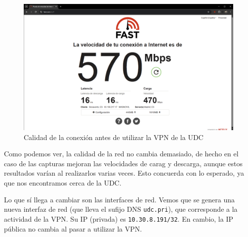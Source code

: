 \begin{figure}[H]
    \centering
    \includegraphics[width=\linewidth]{CalidadConexion-VPN-UDC.png}
    \caption{Calidad de la conexión antes de utilizar la VPN de la UDC}
    \label{fig:Calidad-Conexión-VPN-UDC}
\end{figure}


Como podemos ver, la calidad de la red no cambia demasiado, de hecho en el caso de las capturas mejoran las velocidades de carag y descarga, aunque estos resultados varían al realizarlos varias veces.
Esto concuerda con lo esperado, ya que nos encontramos cerca de la UDC.

Lo que sí llega a cambiar son las interfaces de red. Vemos que se genera una nueva interfaz de red (que lleva el sufijo DNS \texttt{udc.pri}), que corresponde a la actividad de la VPN. Su IP (privada) es \texttt{10.30.8.191/32}.
En cambio, la IP pública no cambia al pasar a utilizar la VPN.
